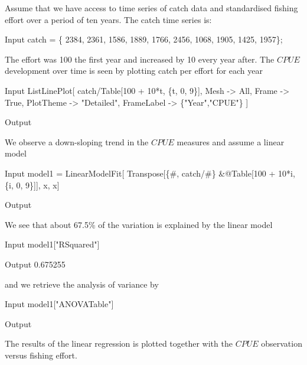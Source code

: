 \documentclass[11pt,fleqn]{book} %
\begin{document}
\begin{theorem}
\hfill \break
Assume that we have access to time series of catch data and standardised fishing effort over a period of ten years. The catch time series is:
\begin{mmaCell}[index=1]{Input}
  catch = \{
  2384, 2361, 1586, 1889, 1766, 2456, 1068, 1905, 1425, 1957\};
\end{mmaCell}
The effort was 100 the first year and increased by 10 every year after. The $CPUE$ development over time is seen by plotting catch per effort for each year
\begin{mmaCell}{Input}
  ListLinePlot[
    catch/Table[100 + 10*t, \{t, 0, 9\}], 
    Mesh       -> All,
    Frame      -> True,
    PlotTheme  -> "Detailed",
    FrameLabel -> \{"Year","CPUE"\}
  ]
\end{mmaCell}
\begin{mmaCell}[moregraphics={moreig={scale=.7}}]{Output}
\end{mmaCell}
We observe a down-sloping trend in the $CPUE$ measures and assume a linear model
\begin{mmaCell}{Input}
  model1 = LinearModelFit[
  Transpose[\{#, catch/#\} &@Table[100 + 10*i, \{i, 0, 9\}]], x, x]
\end{mmaCell}
\begin{mmaCell}[moregraphics={moreig={scale=1}}]{Output}
\end{mmaCell}
We see that about 67.5\% of the variation is explained by the linear model
\begin{mmaCell}{Input}
  model1["RSquared"]
\end{mmaCell}
\begin{mmaCell}{Output}
  0.675255
\end{mmaCell}
and we retrieve the analysis of variance by
\begin{mmaCell}{Input}
  model1["ANOVATable"]
\end{mmaCell}
\begin{mmaCell}[moregraphics={moreig={scale=1}}]{Output}
\end{mmaCell}
The results of the linear regression is plotted together with the $CPUE$ observation versus fishing effort.

\end{theorem}
\end{document}
